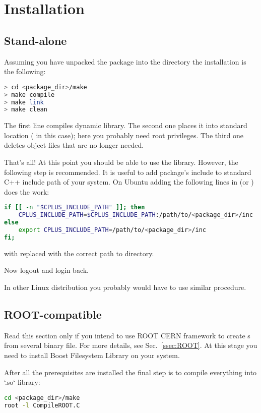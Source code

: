 \section{Installation}
\label{sec:inst}
\subsection{Stand-alone}
Assuming you have unpacked the package into the directory  the installation is the following:

\begin{lstlisting}[language=bash]
> cd <package_dir>/make
> make compile
> make link
> make clean
\end{lstlisting}

The first  line compiles dynamic library. The second one places it into
standard location ( in this case); here you probably need root privileges.
The third one deletes object files that are no longer needed.

That's all! At this point you should be able to use the library. However, the following 
step is recommended. It is useful to add package's include to standard C++ include path of 
your system. On Ubuntu adding the following lines in  (or ) does the work:

\begin{lstlisting}[language=bash]
if [[ -n "$CPLUS_INCLUDE_PATH" ]]; then
    CPLUS_INCLUDE_PATH=$CPLUS_INCLUDE_PATH:/path/to/<package_dir>/inc
else
    export CPLUS_INCLUDE_PATH=/path/to/<package_dir>/inc
fi;
\end{lstlisting}
with  replaced with the correct path to  directory.

Now logout and login back.

In other Linux distribution you probably would have to use similar procedure. 

\subsection{ROOT-compatible}\label{ssec:install:ROOT}
Read this section only if you intend to use ROOT CERN framework to create s
from several binary file. For more details, see Sec.~\ref{ssec:ROOT}.
At this stage you need to install Boost Filesystem Library on your system.

After all the prerequisites are installed the final step is to compile everything into `.so` library: 
\begin{lstlisting}[language=bash]
cd <package_dir>/make
root -l CompileROOT.C
\end{lstlisting}
